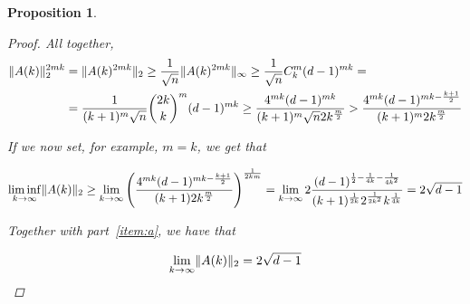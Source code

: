 \documentclass{amsart}
\theoremstyle{plain}
\newtheorem*{proposition}{\textbf{Proposition}}
\theoremstyle{definition}
\DeclarePairedDelimiter{\norm}{\lVert}{\rVert}
\begin{document}
\begin{proposition}
\begin{proof}
            All together,
            \begin{align*}
                    \norm{A(k)}_2^{2mk}
                    & = \norm{A(k)^{2mk}}_2
                    \geq \frac{1}{\sqrt{n}} \norm{A(k)^{2mk}}_\infty
                    \geq \frac{1}{\sqrt{n}} C_{k}^m (d-1)^{mk} = \\
                    & = \frac{1}{(k+1)^m\sqrt{n}} \binom{2k}{k}^{m} (d-1)^{mk} \geq
                    \frac{4^{mk}(d-1)^{mk}}{(k+1)^m \sqrt{n} 2k^{\frac{m}{2}}} >
                    \frac{4^{mk}(d-1)^{mk - \frac{k+1}{2}}}{(k+1)^m 2k^{\frac{m}{2}}}
            \end{align*}

            If we now set, for example, $m = k$, we get that

            \begin{equation*}
                \liminf_{k \to \infty} \norm{A(k)}_2 \geq
                \lim_{k \to \infty} \left( \frac{4^{mk}(d-1)^{mk - \frac{k+1}{2}}}{(k+1)2k^{\frac{m}{2}}} \right)^{\frac{1}{2km}} =
                \lim_{k \to \infty} 2 \frac{(d-1)^{\frac{1}{2} - \frac{1}{4k} - \frac{1}{4k^2}}}{(k+1)^{\frac{1}{2k}} 2^{\frac{1}{2k^2}} k ^{\frac{1}{4k}}}
                = 2 \sqrt{d-1}
            \end{equation*}

            Together with part~\ref{item:a}, we have that

            \begin{equation*}
                \lim_{k \to \infty} \norm{A(k)}_2 = 2 \sqrt{d-1}
            \end{equation*}

        \end{proof}
    \end{proposition}
\end{document}
